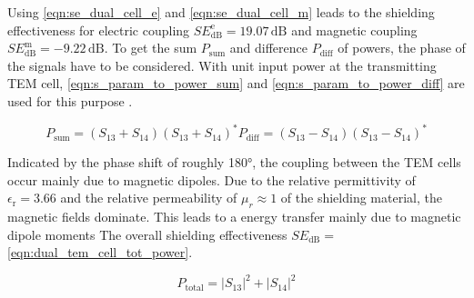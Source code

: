 Using \autoref{eqn:se_dual_cell_e} and \autoref{eqn:se_dual_cell_m} leads to the shielding effectiveness for electric coupling $SE_\mathrm{dB}^\mathrm{e}=19.07\,\mathrm{dB}$ and magnetic coupling $SE_\mathrm{dB}^\mathrm{m}=-9.22\,\mathrm{dB}$.  To get the sum $P_\mathrm{sum}$ and difference $P_\mathrm{diff}$ of powers, the phase of the signals have to be considered. With unit input power at the transmitting TEM cell, \autoref{eqn:s_param_to_power_sum} and \autoref{eqn:s_param_to_power_diff} are used for this purpose \cite{Sreenivasiah_Chang_Ma_1981}. 

\begin{subequations}
\begin{equation}
    P_\mathrm{sum} = (S_{13} + S_{14})(S_{13} + S_{14})^*
    \label{eqn:s_param_to_power_sum}
\end{equation}
\begin{equation}
    P_\mathrm{diff}= (S_{13} - S_{14})(S_{13} - S_{14})^*
    \label{eqn:s_param_to_power_diff}
\end{equation}
\end{subequations}

Indicated by the phase shift of roughly 180°, the coupling between the TEM cells occur mainly due to magnetic dipoles. Due to the relative permittivity of $\epsilon _\mathrm{r}=3.66$ and the relative permeability of $\mu_r\approx 1$ of the shielding material, the magnetic fields dominate. This leads to a energy transfer mainly due to magnetic dipole moments The overall shielding effectiveness $SE_\mathrm{dB}=$ \autoref{eqn:dual_tem_cell_tot_power}.

\begin{equation}
    P_\mathrm{total}=|S_{13}|^2+|S_{14}|^2
    \label{eqn:dual_tem_cell_tot_power}
\end{equation}

